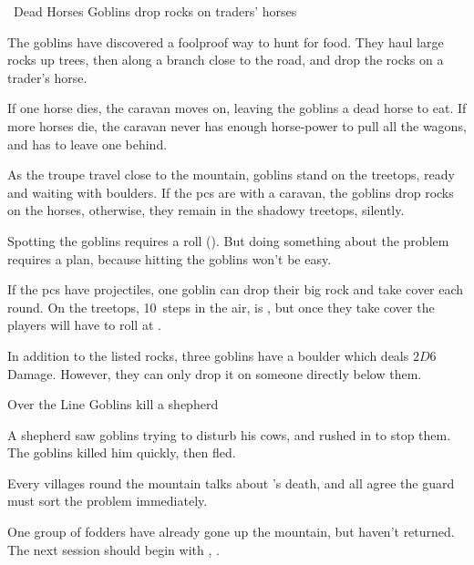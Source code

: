 \begin{multicols}{2}
{  %
  {~Dead Horses}%
  {Goblins drop rocks on traders' horses}%

  \begin{exampletext}
    The goblins have discovered a foolproof way to hunt for food.
    They haul large rocks up trees, then along a branch close to the road, and drop the rocks on a trader's horse.

    If one horse dies, the caravan moves on, leaving the goblins a dead horse to eat.
    If more horses die, the caravan never has enough horse-power to pull all the wagons, and has to leave one behind.
  \end{exampletext}

  As the troupe travel close to the mountain, goblins stand on the treetops, ready and waiting with boulders.
  If the \glspl{pc} are with a caravan, the goblins drop rocks on the horses, otherwise, they remain in the shadowy treetops, silently.

  Spotting the goblins requires a  roll (\tn[10]).
  But doing something about the problem requires a plan, because hitting the goblins won't be easy.

  If the \glspl{pc} have \glspl{projectile}, one goblin can drop their big rock and take cover each \gls{round}.
  On the treetops, 10~\glspl{step} in the air, is \tn[9], but once they take cover the players will have to roll at \tn[11].

  \goblin

  \goblin

  In addition to the listed rocks, three goblins have a boulder which deals $2D6$ Damage.
  However, they can only drop it on someone directly below them.

  {Over the Line}%
  {Goblins kill a shepherd}%

  \begin{exampletext}
    A shepherd saw goblins trying to disturb his cows, and rushed in to stop them.
    The goblins killed him quickly, then fled.
  \end{exampletext}

  Every \glspl{village} round the mountain talks about \composeHumanName's death, and all agree the \gls{guard} must sort the problem immediately.

  One group of \glspl{fodder} have already gone up the mountain, but haven't returned.
  The next session should begin with , .
}


\end{multicols}
